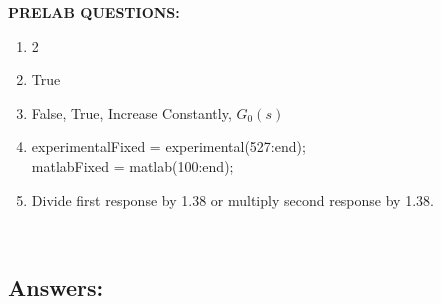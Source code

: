 \documentclass[11pt,a4paper]{article}
\begin{document}
\pagebreak
\textbf{PRELAB QUESTIONS:}
\begin{enumerate}
	\item 2
	\item True
	\item False, True, Increase Constantly, $G_0(s)$
	\item experimentalFixed = experimental(527:end);\\matlabFixed = matlab(100:end);
	\item Divide first response by 1.38 or multiply second response by 1.38.
\end{enumerate}









\pagebreak~\pagebreak
\subsection{Answers:}
\end{document}
